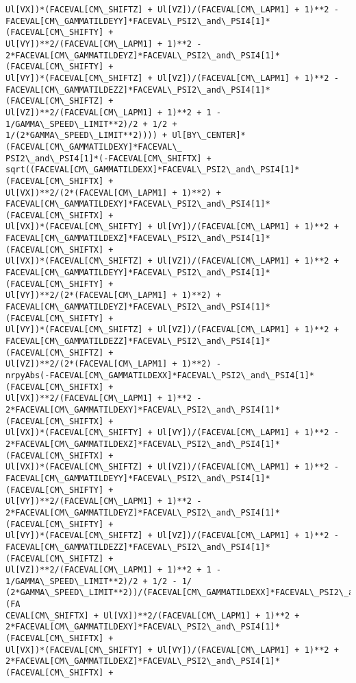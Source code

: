 \documentclass[landscape,letterpaper,10pt,english]{article}
\begin{document}
\begin{Verbatim}[commandchars=\\\{\}]
Ul[VX])*(FACEVAL[CM\_SHIFTZ] + Ul[VZ])/(FACEVAL[CM\_LAPM1] + 1)**2 -
FACEVAL[CM\_GAMMATILDEYY]*FACEVAL\_PSI2\_and\_PSI4[1]*(FACEVAL[CM\_SHIFTY] +
Ul[VY])**2/(FACEVAL[CM\_LAPM1] + 1)**2 -
2*FACEVAL[CM\_GAMMATILDEYZ]*FACEVAL\_PSI2\_and\_PSI4[1]*(FACEVAL[CM\_SHIFTY] +
Ul[VY])*(FACEVAL[CM\_SHIFTZ] + Ul[VZ])/(FACEVAL[CM\_LAPM1] + 1)**2 -
FACEVAL[CM\_GAMMATILDEZZ]*FACEVAL\_PSI2\_and\_PSI4[1]*(FACEVAL[CM\_SHIFTZ] +
Ul[VZ])**2/(FACEVAL[CM\_LAPM1] + 1)**2 + 1 - 1/GAMMA\_SPEED\_LIMIT**2)/2 + 1/2 +
1/(2*GAMMA\_SPEED\_LIMIT**2)))) + Ul[BY\_CENTER]*(FACEVAL[CM\_GAMMATILDEXY]*FACEVAL\_
PSI2\_and\_PSI4[1]*(-FACEVAL[CM\_SHIFTX] +
sqrt((FACEVAL[CM\_GAMMATILDEXX]*FACEVAL\_PSI2\_and\_PSI4[1]*(FACEVAL[CM\_SHIFTX] +
Ul[VX])**2/(2*(FACEVAL[CM\_LAPM1] + 1)**2) +
FACEVAL[CM\_GAMMATILDEXY]*FACEVAL\_PSI2\_and\_PSI4[1]*(FACEVAL[CM\_SHIFTX] +
Ul[VX])*(FACEVAL[CM\_SHIFTY] + Ul[VY])/(FACEVAL[CM\_LAPM1] + 1)**2 +
FACEVAL[CM\_GAMMATILDEXZ]*FACEVAL\_PSI2\_and\_PSI4[1]*(FACEVAL[CM\_SHIFTX] +
Ul[VX])*(FACEVAL[CM\_SHIFTZ] + Ul[VZ])/(FACEVAL[CM\_LAPM1] + 1)**2 +
FACEVAL[CM\_GAMMATILDEYY]*FACEVAL\_PSI2\_and\_PSI4[1]*(FACEVAL[CM\_SHIFTY] +
Ul[VY])**2/(2*(FACEVAL[CM\_LAPM1] + 1)**2) +
FACEVAL[CM\_GAMMATILDEYZ]*FACEVAL\_PSI2\_and\_PSI4[1]*(FACEVAL[CM\_SHIFTY] +
Ul[VY])*(FACEVAL[CM\_SHIFTZ] + Ul[VZ])/(FACEVAL[CM\_LAPM1] + 1)**2 +
FACEVAL[CM\_GAMMATILDEZZ]*FACEVAL\_PSI2\_and\_PSI4[1]*(FACEVAL[CM\_SHIFTZ] +
Ul[VZ])**2/(2*(FACEVAL[CM\_LAPM1] + 1)**2) -
nrpyAbs(-FACEVAL[CM\_GAMMATILDEXX]*FACEVAL\_PSI2\_and\_PSI4[1]*(FACEVAL[CM\_SHIFTX] +
Ul[VX])**2/(FACEVAL[CM\_LAPM1] + 1)**2 -
2*FACEVAL[CM\_GAMMATILDEXY]*FACEVAL\_PSI2\_and\_PSI4[1]*(FACEVAL[CM\_SHIFTX] +
Ul[VX])*(FACEVAL[CM\_SHIFTY] + Ul[VY])/(FACEVAL[CM\_LAPM1] + 1)**2 -
2*FACEVAL[CM\_GAMMATILDEXZ]*FACEVAL\_PSI2\_and\_PSI4[1]*(FACEVAL[CM\_SHIFTX] +
Ul[VX])*(FACEVAL[CM\_SHIFTZ] + Ul[VZ])/(FACEVAL[CM\_LAPM1] + 1)**2 -
FACEVAL[CM\_GAMMATILDEYY]*FACEVAL\_PSI2\_and\_PSI4[1]*(FACEVAL[CM\_SHIFTY] +
Ul[VY])**2/(FACEVAL[CM\_LAPM1] + 1)**2 -
2*FACEVAL[CM\_GAMMATILDEYZ]*FACEVAL\_PSI2\_and\_PSI4[1]*(FACEVAL[CM\_SHIFTY] +
Ul[VY])*(FACEVAL[CM\_SHIFTZ] + Ul[VZ])/(FACEVAL[CM\_LAPM1] + 1)**2 -
FACEVAL[CM\_GAMMATILDEZZ]*FACEVAL\_PSI2\_and\_PSI4[1]*(FACEVAL[CM\_SHIFTZ] +
Ul[VZ])**2/(FACEVAL[CM\_LAPM1] + 1)**2 + 1 - 1/GAMMA\_SPEED\_LIMIT**2)/2 + 1/2 - 1/
(2*GAMMA\_SPEED\_LIMIT**2))/(FACEVAL[CM\_GAMMATILDEXX]*FACEVAL\_PSI2\_and\_PSI4[1]*(FA
CEVAL[CM\_SHIFTX] + Ul[VX])**2/(FACEVAL[CM\_LAPM1] + 1)**2 +
2*FACEVAL[CM\_GAMMATILDEXY]*FACEVAL\_PSI2\_and\_PSI4[1]*(FACEVAL[CM\_SHIFTX] +
Ul[VX])*(FACEVAL[CM\_SHIFTY] + Ul[VY])/(FACEVAL[CM\_LAPM1] + 1)**2 +
2*FACEVAL[CM\_GAMMATILDEXZ]*FACEVAL\_PSI2\_and\_PSI4[1]*(FACEVAL[CM\_SHIFTX] +

\end{Verbatim}
\end{document}
